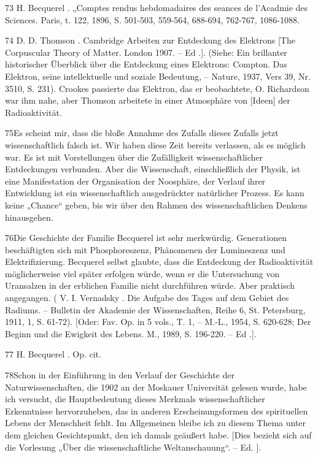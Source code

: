 \documentclass[11pt,a4paper]{book}
\begin{document}
73 H. Becquerel . „Comptes rendus hebdomadaires des seances de l'Acadmie des Sciences. Paris, t. 122, 1896, S. 501-503, 559-564, 688-694, 762-767, 1086-1088.



74 D. D. Thomson . Cambridge Arbeiten zur Entdeckung des Elektrons [The Corpuscular Theory of Matter. London 1907. -- Ed .]. (Siehe: Ein brillanter historischer Überblick über die Entdeckung eines Elektrons: Compton. Das Elektron, seine intellektuelle und soziale Bedeutung, -- Nature, 1937, Vers 39, Nr. 3510, S. 231). Crookes passierte das Elektron, das er beobachtete, O. Richardson war ihm nahe, aber Thomson arbeitete in einer Atmosphäre von [Ideen] der Radioaktivität.



75Es scheint mir, dass die bloße Annahme des Zufalls dieses Zufalls jetzt wissenschaftlich falsch ist. Wir haben diese Zeit bereits verlassen, als es möglich war. Es ist mit Vorstellungen über die Zufälligkeit wissenschaftlicher Entdeckungen verbunden. Aber die Wissenschaft, einschließlich der Physik, ist eine Manifestation der Organisation der Noosphäre, der Verlauf ihrer Entwicklung ist ein wissenschaftlich ausgedrückter natürlicher Prozess. Es kann keine „Chance“ geben, bis wir über den Rahmen des wissenschaftlichen Denkens hinausgehen.



76Die Geschichte der Familie Becquerel ist sehr merkwürdig. Generationen beschäftigten sich mit Phosphoreszenz, Phänomenen der Lumineszenz und Elektrifizierung. Becquerel selbst glaubte, dass die Entdeckung der Radioaktivität möglicherweise viel später erfolgen würde, wenn er die Untersuchung von Uransalzen in der erblichen Familie nicht durchführen würde. Aber praktisch angegangen. ( V. I. Vernadsky . Die Aufgabe des Tages auf dem Gebiet des Radiums. -- Bulletin der Akademie der Wissenschaften, Reihe 6, St. Petersburg, 1911, 1, S. 61-72). [Oder: Fav. Op. in 5 vols., T. 1, -- M.-L., 1954, S. 620-628; Der Beginn und die Ewigkeit des Lebens. M., 1989, S. 196-220. -- Ed .].



77 H. Becquerel . Op. cit.



78Schon in der Einführung in den Verlauf der Geschichte der Naturwissenschaften, die 1902 an der Moskauer Universität gelesen wurde, habe ich versucht, die Hauptbedeutung dieses Merkmals wissenschaftlicher Erkenntnisse hervorzuheben, das in anderen Erscheinungsformen des spirituellen Lebens der Menschheit fehlt. Im Allgemeinen bleibe ich zu diesem Thema unter dem gleichen Gesichtspunkt, den ich damals geäußert habe. [Dies bezieht sich auf die Vorlesung „Über die wissenschaftliche Weltanschauung“. -- Ed. ].
\end{document}
